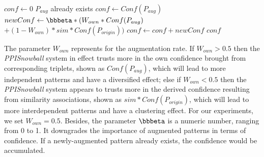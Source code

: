 \begin{codebox}
\li $conf \gets 0$
\li \If $P_{aug}$ already exists
\li     \Then
            $conf \gets Conf(P_{aug})$
        \End
\li $newConf \gets \bbbeta *(W_{own}*Conf(P_{aug})$\zi \space\space\space\space\space\space\space $+(1-W_{own})*sim*Conf(P_{origin}))$
\li $conf \gets conf+newConf$
\li \Return $conf$
\end{codebox}

The parameter $W_{own}$ represents for the augmentation rate. If $W_{own}>0.5$ then the \emph{PPISnowball} system in effect trusts more in the own confidence brought from corresponding triplets, shown as $Conf(P_{aug})$, which will lead to more independent patterns and have a diversified effect; else if $W_{own}<0.5$ then the \emph{PPISnowball} system appears to trusts more in the derived confidence resulting from similarity associations, shown as $sim*Conf(P_{origin})$, which will lead to more interdependent patterns and have a clustering effect. For our experiments, we set $W_{own}=0.5$. Besides, the parameter $\bbbeta$ is a numeric number, ranging from 0 to 1. It downgrades the importance of augmented patterns in terms of confidence. If a newly-augmented pattern already exists, the confidence would be accumulated.


